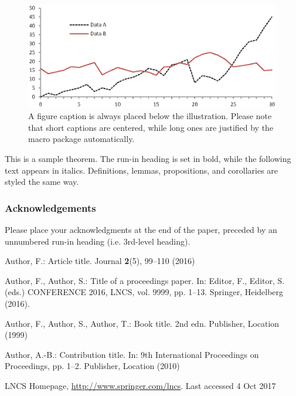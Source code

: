 \documentclass[runningheads]{llncs}
\begin{document}
\begin{figure}
\includegraphics[width=\textwidth]{fig1.eps}
\caption{A figure caption is always placed below the illustration.
Please note that short captions are centered, while long ones are
justified by the macro package automatically.} \label{fig1}
\end{figure}

\begin{theorem}
This is a sample theorem. The run-in heading is set in bold, while
the following text appears in italics. Definitions, lemmas,
propositions, and corollaries are styled the same way.
\end{theorem}
%
%

\subsubsection{Acknowledgements} Please place your acknowledgments at
the end of the paper, preceded by an unnumbered run-in heading (i.e.
3rd-level heading).

%
%
%
% 
% 
%
\begin{thebibliography}{8}
Author, F.: Article title. Journal \textbf{2}(5), 99--110 (2016)

Author, F., Author, S.: Title of a proceedings paper. In: Editor,
F., Editor, S. (eds.) CONFERENCE 2016, LNCS, vol. 9999, pp. 1--13.
Springer, Heidelberg (2016). 

Author, F., Author, S., Author, T.: Book title. 2nd edn. Publisher,
Location (1999)

Author, A.-B.: Contribution title. In: 9th International Proceedings
on Proceedings, pp. 1--2. Publisher, Location (2010)

LNCS Homepage, \url{http://www.springer.com/lncs}. Last accessed 4
Oct 2017
\end{thebibliography}
\end{document}
